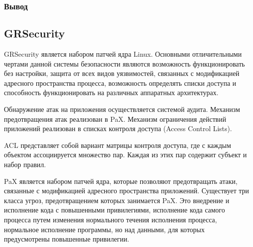 \begin{comment}
\bigskip
Профиль состоит из записей, которые содержат 
полные пути до файлов или каталогов 
каталогов с указанием полных и указания прав
доступа к ним. При этом r~--— 
разрешение на чтение, w~--— запись(за исключением создания 
и удаления файлов), ix~--— исполнение и наследование текущего 
профиля, px~--— исполнение под специфическим профилем, Px — 
защищенное выполнение, ux — неограниченное исполнение, 
Ux~--- защищенное неограниченное исполнение, m~--— присвоение 
участку памяти атрибута "исполняемый", I~--— жесткая ссылка. 
Чтобы подключить готовый профиль к AppArmor, достаточно его 
скопировать в каталог /etc/apparmor.d. 

\end{comment}

\subsubsection{Вывод}

\subsection{GRSecurity} 
 
GRSecurity является набором патчей ядра Linux.
Основными отличительными чертами данной системы 
безопасности являются возможность функционировать 
без настройки, защита от всех видов уязвимостей, 
связанных с модификацией адресного пространства 
процесса, возможность определять списки доступа и 
способность функционировать на различных аппаратных 
архитектурах. 

Обнаружение атак на приложения осуществляется
системой аудита. Механизм предотвращения атак 
реализован в PaX. Механизм ограничения действий 
приложений реализован в списках контроля доступа
(Access Control Lists). 

ACL представляет собой  вариант матрицы контроля доступа, где с 
каждым объектом ассоциируется множество пар. 
Каждая из этих пар содержит субъект и набор правил. 

PaX является набором патчей ядра, которые позволяют 
предотвращать атаки, связанные с модификацией адресного
пространства приложений. 
Существует три класса угроз, предотвращением которых 
занимается PaX. Это внедрение и исполнение кода с 
повышенными привилегиями, исполнение кода самого 
процесса путем изменения нормального течения 
исполнения процесса, нормальное исполнение программы, 
но над данными, для которых предусмотрены повышенные 
привилегии. 

